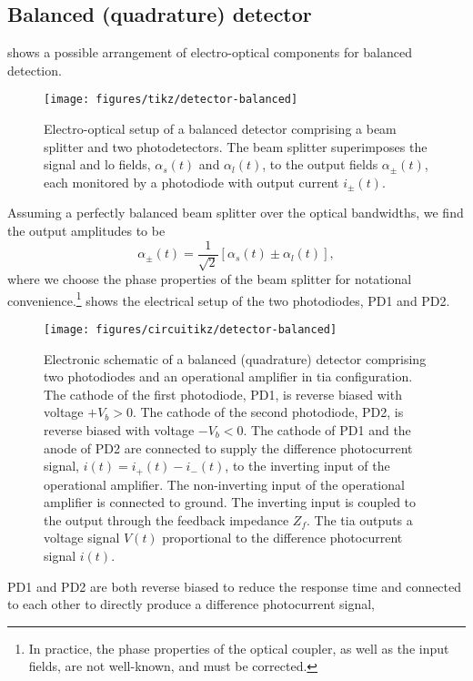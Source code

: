 \FloatBarrier
\subsection{Balanced (quadrature) detector}

 shows a possible arrangement of electro-optical components for balanced detection.
\begin{figure}[htb]
    \centering
    \texttt{[image: figures/tikz/detector-balanced]}
    \caption{Electro-optical setup of a balanced detector comprising a beam splitter and two photodetectors. The beam splitter superimposes the signal and \gls{lo} fields, $\alpha_s(t)$ and $\alpha_l(t)$, to the output fields $\alpha_\pm(t)$, each monitored by a photodiode with output current $i_\pm(t)$.}\label{fig:detector_balanced_optics}
\end{figure}
Assuming a perfectly balanced beam splitter over the optical bandwidths, we find the output amplitudes to be
\begin{equation}
	\alpha_\pm(t)
	=
	\frac{1}{\sqrt{2}}
	\left[
		\alpha_s(t)
		\pm
		\alpha_l(t)
	\right]
	\label{eq:detector_balanced_amplitudes}
	,
\end{equation}
where we choose the phase properties of the beam splitter for notational convenience.\footnote{In practice, the phase properties of the optical coupler, as well as the input fields, are not well-known, and must be corrected.}
 shows the electrical setup of the two photodiodes, PD1 and PD2.
\begin{figure}[htb]
    \centering
    \texttt{[image: figures/circuitikz/detector-balanced]}
    \caption{Electronic schematic of a balanced (quadrature) detector comprising two photodiodes and an operational amplifier in \gls{tia} configuration. The cathode of the first photodiode, PD1, is reverse biased with voltage $+V_b>0$. The cathode of the second photodiode, PD2, is reverse biased with voltage $-V_b<0$. The cathode of PD1 and the anode of PD2 are connected to supply the difference photocurrent signal, $i(t)=i_+(t)-i_-(t)$, to the inverting input of the operational amplifier. The non-inverting input of the operational amplifier is connected to ground. The inverting input is coupled to the output through the feedback impedance $Z_f$. The \gls{tia} outputs a voltage signal $V(t)$ proportional to the difference photocurrent signal $i(t)$.}\label{fig:detector_balanced_electronics}
\end{figure}
PD1 and PD2 are both reverse biased to reduce the response time and connected to each other to directly produce a difference photocurrent signal,
